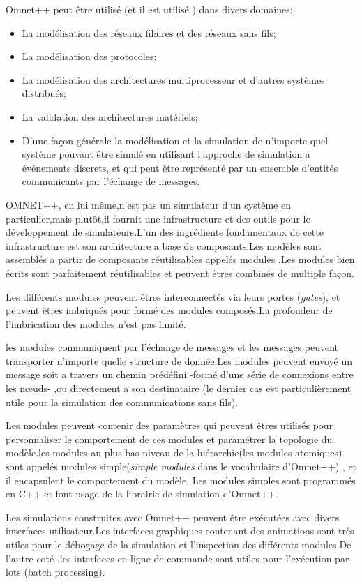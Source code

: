Omnet++ peut être utilisé (et il est utilisé ) dans divers domaines:
\begin{itemize}
\item La modélisation des réseaux filaires et des réseaux sans fils; 
\item La modélisation des protocoles;
\item La modélisation des architectures multiprocesseur et d'autres systèmes distribués;
\item La validation des architectures matériels;
\item D'une façon générale la modélisation et la simulation de n'importe quel système pouvant être simulé en utilisant l'approche de simulation a événements discrets, et qui peut être représenté par un ensemble d'entités communicants par l'échange de messages.
\end{itemize}

OMNET++, en lui même,n'est pas un simulateur d'un système en particulier,mais plutôt,il fournit une infrastructure et des outils pour le développement de simulateurs.L'un des ingrédients fondamentaux de cette infrastructure est son architecture a base de composants.Les modèles sont assemblés a partir de composants réutilisables appelés modules .Les modules bien écrits sont parfaitement réutilisables et peuvent êtres combinés de multiple façon. 

Les différents modules peuvent êtres interconnectés via leurs portes (\emph{gates}), et peuvent êtres imbriqués pour formé des modules composés.La profondeur de l'imbrication des modules n'est pas limité.

les modules communiquent par l'échange de messages et les messages peuvent transporter n'importe quelle structure de donnée.Les modules peuvent envoyé un message soit a travers un chemin prédéfini -formé d'une série de connexions entre les nœuds- ,ou directement a son destinataire (le dernier cas est particulièrement utile pour la simulation des communications sans fils).

Les modules peuvent contenir des paramètres qui peuvent êtres utilisés pour personnaliser le comportement de ces modules et paramétrer la topologie du modèle.les modules au plus bas niveau de la hiérarchie(les modules atomiques) sont appelés modules simple(\emph{simple modules} dans le vocabulaire d'Omnet++) , et il encapsulent le comportement du modèle. Les modules simples sont programmés en C++ et font usage de la librairie de simulation d'Omnet++.

Les simulations construites avec Omnet++ peuvent être exécutées avec divers interfaces utilisateur.Les interfaces graphiques contenant des animations sont très utiles pour le débogage de la simulation et l'inspection des différents modules.De l'autre coté ,les interfaces en ligne de commande sont utiles pour l'exécution par lots (batch processing).

